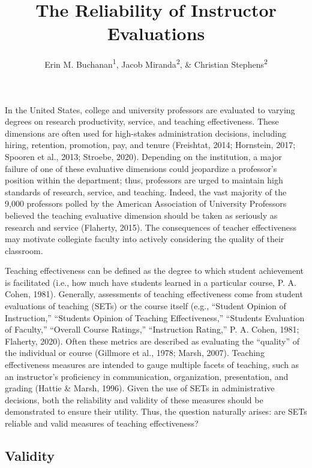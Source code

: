 \documentclass[
  man]{apa7}
\title{The Reliability of Instructor Evaluations}
\author{Erin M. Buchanan\textsuperscript{1}, Jacob Miranda\textsuperscript{2}, \& Christian Stephens\textsuperscript{2}}
\date{}
\affiliation{\vspace{0.5cm}\textsuperscript{1} Harrisburg University of Science and Technology\\\textsuperscript{2} University of Alabama}
\begin{document}
\maketitle

In the United States, college and university professors are evaluated to
varying degrees on research productivity, service, and teaching
effectiveness. These dimensions are often used for high-stakes
administration decisions, including hiring, retention, promotion, pay,
and tenure (Freishtat, 2014; Hornstein, 2017; Spooren et al., 2013; Stroebe, 2020).
Depending on the institution, a major failure of one of these evaluative
dimensions could jeopardize a professor's position within the
department; thus, professors are urged to maintain high standards of
research, service, and teaching. Indeed, the vast majority of the 9,000
professors polled by the American Association of University Professors
believed the teaching evaluative dimension should be taken as seriously
as research and service (Flaherty, 2015). The consequences of teacher
effectiveness may motivate collegiate faculty into actively considering
the quality of their classroom.

Teaching effectiveness can be defined as the degree to which student
achievement is facilitated (i.e., how much have students learned in a
particular course, P. A. Cohen, 1981). Generally, assessments of teaching
effectiveness come from student evaluations of teaching (SETs) or the
course itself (e.g., ``Student Opinion of Instruction,'' ``Students Opinion
of Teaching Effectiveness,'' ``Students Evaluation of Faculty,'' ``Overall
Course Ratings,'' ``Instruction Rating,'' P. A. Cohen, 1981; Flaherty, 2020). Often
these metrics are described as evaluating the ``quality'' of the
individual or course (Gillmore et al., 1978; Marsh, 2007). Teaching effectiveness
measures are intended to gauge multiple facets of teaching, such as an
instructor's proficiency in communication, organization, presentation,
and grading (Hattie \& Marsh, 1996). Given the use of SETs in administrative
decisions, both the reliability and validity of these measures should be
demonstrated to ensure their utility. Thus, the question naturally
arises: are SETs reliable and valid measures of teaching effectiveness?

\hypertarget{validity}{%
\subsection{Validity}\label{validity}}
\end{document}
